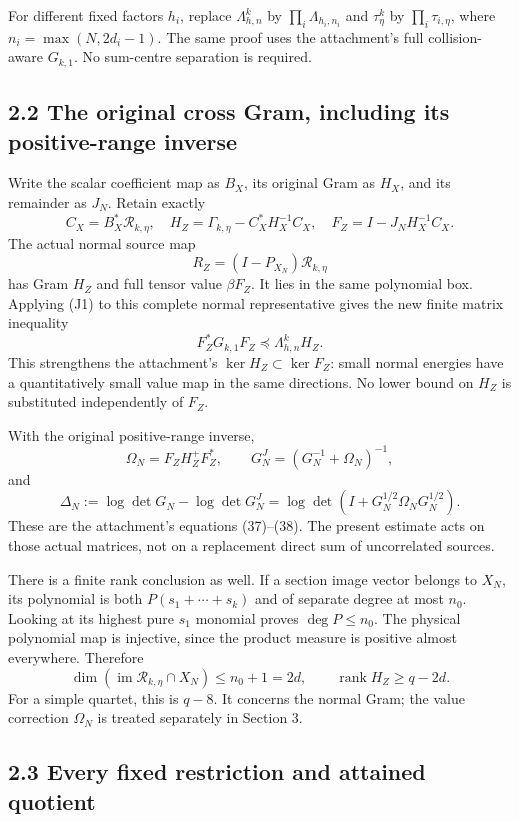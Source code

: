 \documentclass[11pt]{article}
\begin{document}
For different fixed factors \(h_i\), replace \(\Lambda_{h,n}^k\) by \(\prod_i\Lambda_{h_i,n_i}\) and \(\tau_\eta^k\) by \(\prod_i\tau_{i,\eta}\), where \(n_i=\max(N,2d_i-1)\). The same proof uses the attachment's full collision-aware \(G_{k,1}\). No sum-centre separation is required.

\subsection{2.2 The original cross Gram, including its positive-range inverse}\label{the-original-cross-gram-including-its-positive-range-inverse}

Write the scalar coefficient map as \(B_X\), its original Gram as \(H_X\), and its remainder as \(J_N\). Retain exactly \[
 C_X=B_X^*\mathcal R_{k,\eta},\quad
 H_Z=\Gamma_{k,\eta}-C_X^*H_X^{-1}C_X,\quad
 F_Z=I-J_NH_X^{-1}C_X. \tag{J5}
\] The actual normal source map \[
 R_Z=(I-P_{X_N})\mathcal R_{k,\eta}
\] has Gram \(H_Z\) and full tensor value \(\beta F_Z\). It lies in the same polynomial box. Applying (J1) to this complete normal representative gives the new finite matrix inequality \[
 \boxed{F_Z^*G_{k,1}F_Z\preceq\Lambda_{h,n}^k H_Z.} \tag{J6}
\] This strengthens the attachment's \(\ker H_Z\subset\ker F_Z\): small normal energies have a quantitatively small value map in the same directions. No lower bound on \(H_Z\) is substituted independently of \(F_Z\).

With the original positive-range inverse, \[
 \Omega_N=F_ZH_Z^+F_Z^*,\qquad
 G_N^J=(G_N^{-1}+\Omega_N)^{-1}, \tag{J7}
\] and \[
 \Delta_N:=\log\det G_N-\log\det G_N^J
 =\log\det(I+G_N^{1/2}\Omega_NG_N^{1/2}). \tag{J8}
\] These are the attachment's equations (37)--(38). The present estimate acts on those actual matrices, not on a replacement direct sum of uncorrelated sources.

There is a finite rank conclusion as well. If a section image vector belongs to \(X_N\), its polynomial is both \(P(s_1+\cdots+s_k)\) and of separate degree at most \(n_0\). Looking at its highest pure \(s_1\) monomial proves \(\deg P\le n_0\). The physical polynomial map is injective, since the product measure is positive almost everywhere. Therefore \[
 \dim(\operatorname{im}\mathcal R_{k,\eta}\cap X_N)\le n_0+1=2d,
 \qquad
 \boxed{\operatorname{rank}H_Z\ge q-2d.} \tag{J9}
\] For a simple quartet, this is \(q-8\). It concerns the normal Gram; the value correction \(\Omega_N\) is treated separately in Section 3.

\subsection{2.3 Every fixed restriction and attained quotient}\label{every-fixed-restriction-and-attained-quotient}
\end{document}
